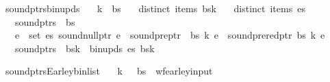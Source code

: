 \begin{isabellebody}
\isadelimproof
%
\endisadelimproof
%
\isatagproof
%
\endisatagproof
{\isafoldproof}%
%
\isadelimproof
%
\endisadelimproof
%
\begin{isamarkuptext}%
%
\end{isamarkuptext}\isamarkuptrue%
\isamarkupfalse%
\ sound{\isacharunderscore}{\kern0pt}ptrs{\isacharunderscore}{\kern0pt}bin{\isacharunderscore}{\kern0pt}upds{\isacharcolon}{\kern0pt}\isanewline
\ \ \ {\isachardoublequoteopen}k\ {\isacharless}{\kern0pt}\ {\isacharbar}{\kern0pt}bs{\isacharbar}{\kern0pt}{\isachardoublequoteclose}\isanewline
\ \ \ {\isachardoublequoteopen}distinct\ {\isacharparenleft}{\kern0pt}items\ {\isacharparenleft}{\kern0pt}bs{\isacharbang}{\kern0pt}k{\isacharparenright}{\kern0pt}{\isacharparenright}{\kern0pt}{\isachardoublequoteclose}\isanewline
\ \ \ {\isachardoublequoteopen}distinct\ {\isacharparenleft}{\kern0pt}items\ es{\isacharparenright}{\kern0pt}{\isachardoublequoteclose}\isanewline
\ \ \ {\isachardoublequoteopen}sound{\isacharunderscore}{\kern0pt}ptrs\ {\isasymomega}\ bs{\isachardoublequoteclose}\isanewline
\ \ \ {\isachardoublequoteopen}{\isasymforall}e\ {\isasymin}\ set\ es{\isachardot}{\kern0pt}\ sound{\isacharunderscore}{\kern0pt}null{\isacharunderscore}{\kern0pt}ptr\ e\ {\isasymand}\ sound{\isacharunderscore}{\kern0pt}pre{\isacharunderscore}{\kern0pt}ptr\ {\isasymomega}\ bs\ k\ e\ {\isasymand}\ sound{\isacharunderscore}{\kern0pt}prered{\isacharunderscore}{\kern0pt}ptr\ bs\ k\ e{\isachardoublequoteclose}\isanewline
\ \ \ {\isachardoublequoteopen}sound{\isacharunderscore}{\kern0pt}ptrs\ {\isasymomega}\ {\isacharparenleft}{\kern0pt}bs{\isacharbrackleft}{\kern0pt}k\ {\isacharcolon}{\kern0pt}{\isacharequal}{\kern0pt}\ bin{\isacharunderscore}{\kern0pt}upds\ es\ {\isacharparenleft}{\kern0pt}bs{\isacharbang}{\kern0pt}k{\isacharparenright}{\kern0pt}{\isacharbrackright}{\kern0pt}{\isacharparenright}{\kern0pt}{\isachardoublequoteclose}%
\isadelimproof
%
\endisadelimproof
%
\isatagproof
%
\endisatagproof
{\isafoldproof}%
%
\isadelimproof
%
\endisadelimproof
%
\begin{isamarkuptext}%
%
\end{isamarkuptext}\isamarkuptrue%
\isamarkupfalse%
\ sound{\isacharunderscore}{\kern0pt}ptrs{\isacharunderscore}{\kern0pt}Earley{\isacharunderscore}{\kern0pt}bin{\isacharunderscore}{\kern0pt}list{\isacharprime}{\kern0pt}{\isacharcolon}{\kern0pt}\isanewline
\ \ \ {\isachardoublequoteopen}{\isacharparenleft}{\kern0pt}k{\isacharcomma}{\kern0pt}\ {\isasymG}{\isacharcomma}{\kern0pt}\ {\isasymomega}{\isacharcomma}{\kern0pt}\ bs{\isacharparenright}{\kern0pt}\ {\isasymin}\ wf{\isacharunderscore}{\kern0pt}earley{\isacharunderscore}{\kern0pt}input{\isachardoublequoteclose}\isanewline

\end{isabellebody}
